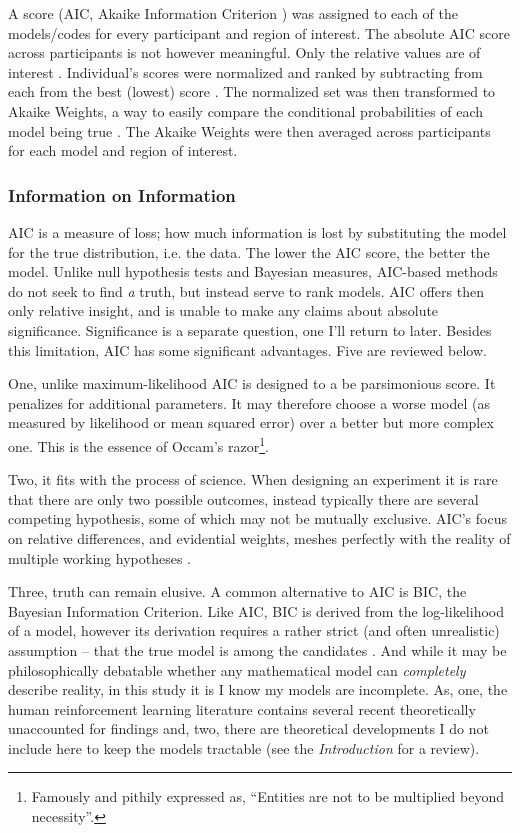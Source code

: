 \documentclass[doc,12pt]{apa}        %
\begin{document}
A score (AIC, Akaike Information Criterion \cite{Akaike:1974p9530}) was assigned to each of the models/codes for every participant and region of interest.  The absolute AIC score across participants is not however meaningful.  Only the relative values are of interest \cite{Wagenmakers:2004p9472}.  Individual's scores were normalized and ranked by subtracting from each from the best (lowest) score \cite{Anderson:2000p9475}. The normalized set was then transformed to Akaike Weights, a way to easily compare the conditional probabilities of each model being true \cite{Wagenmakers:2004p9472}.  The Akaike Weights were then averaged across participants for each model and region of interest.

\subsubsection{Information on Information}
\label{subsub:way}
AIC is a measure of loss; how much information is lost by substituting the model for the true distribution, i.e. the data.  The lower the AIC score, the better the model.  Unlike null hypothesis tests and Bayesian measures, AIC-based methods do not seek to find \emph{a} truth, but instead serve to rank models.  AIC offers then only relative insight, and is unable to make any claims about absolute significance.  Significance is a separate question, one I'll return to later.  Besides this limitation, AIC has some significant advantages. Five are reviewed below.

One, unlike maximum-likelihood AIC is designed to a be parsimonious score.  It penalizes for additional parameters.  It may therefore choose a worse model (as measured by likelihood or mean squared error) over a better but more complex one. This is the essence of Occam's razor\footnote{Famously and pithily expressed as, ``Entities are not to be multiplied beyond necessity''.}. 

Two, it fits with the process of science.  When designing an experiment it is rare that there are only two possible outcomes, instead typically there are several competing hypothesis, some of which may not be mutually exclusive.  AIC's focus on relative differences, and evidential weights, meshes perfectly with the reality of multiple working hypotheses \cite{Burnham:2004p9621}.

Three, truth can remain elusive.  A common alternative to AIC is BIC, the Bayesian Information Criterion.  Like AIC, BIC is derived from the log-likelihood of a model, however its derivation requires a rather strict (and often unrealistic) assumption -- that the true model is among the candidates \cite{Forster:2000p9623}.  And while it may be philosophically debatable whether any mathematical model can \emph{completely} describe reality, in this study it is I know my models are incomplete.  As, one, the human reinforcement learning literature contains several recent theoretically unaccounted for findings and, two, there are theoretical developments I do not include here to keep the models tractable (see the \emph{Introduction} for a review).  
\end{document}
